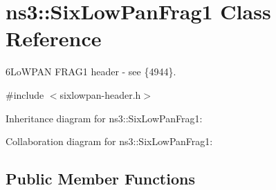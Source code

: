 \hypertarget{classns3_1_1SixLowPanFrag1}{}\section{ns3\+:\+:Six\+Low\+Pan\+Frag1 Class Reference}
\label{classns3_1_1SixLowPanFrag1}


6\+Lo\+W\+P\+AN F\+R\+A\+G1 header -\/ see \{4944\}.  




{\ttfamily \#include $<$sixlowpan-\/header.\+h$>$}



Inheritance diagram for ns3\+:\+:Six\+Low\+Pan\+Frag1\+:


Collaboration diagram for ns3\+:\+:Six\+Low\+Pan\+Frag1\+:
\subsection*{Public Member Functions}
